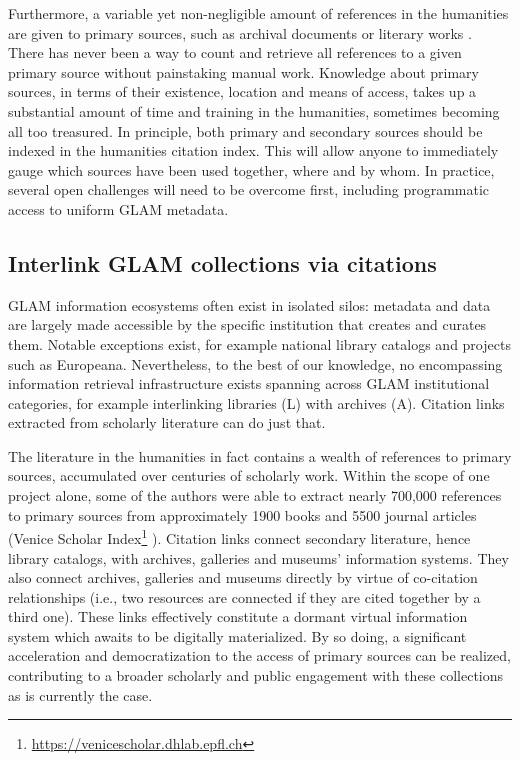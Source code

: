 Furthermore, a variable yet non-negligible amount of references in the humanities are given to primary sources, such as archival documents or literary works \cite{knievel_citation_2005}. There has never been a way to count and retrieve all references to a given primary source without painstaking manual work. Knowledge about primary sources, in terms of their existence, location and means of access, takes up a substantial amount of time and training in the humanities, sometimes becoming all too treasured. In principle, both primary and secondary sources should be indexed in the humanities citation index. This will allow anyone to immediately gauge which sources have been used together, where and by whom. In practice, several open challenges will need to be overcome first, including programmatic access to uniform GLAM metadata.

\subsection{Interlink GLAM collections via citations}\label{sec:interlinking-collections-via-citations}

GLAM information ecosystems often exist in isolated silos: metadata and data are largely made accessible by the specific institution that creates and curates them. Notable exceptions exist, for example national library catalogs and projects such as Europeana. Nevertheless, to the best of our knowledge, no encompassing information retrieval infrastructure exists spanning across GLAM institutional categories, for example interlinking libraries (L) with archives (A). Citation links extracted from scholarly literature can do just that.
 
The literature in the humanities in fact contains a wealth of references to primary sources, accumulated over centuries of scholarly work. Within the scope of one project alone, some of the authors were able to extract nearly 700,000 references to primary sources from approximately 1900 books and 5500 journal articles (Venice Scholar Index\footnote{\url{https://venicescholar.dhlab.epfl.ch}} \cite{colavizza_linked_2018}). Citation links connect secondary literature, hence library catalogs, with archives, galleries and museums’ information systems. They also connect archives, galleries and museums directly by virtue of co-citation relationships (i.e., two resources are connected if they are cited together by a third one). These links effectively constitute a dormant virtual information system which awaits to be digitally materialized. By so doing, a significant acceleration and democratization to the access of primary sources can be realized, contributing to a broader scholarly and public engagement with these collections as is currently the case.
 
